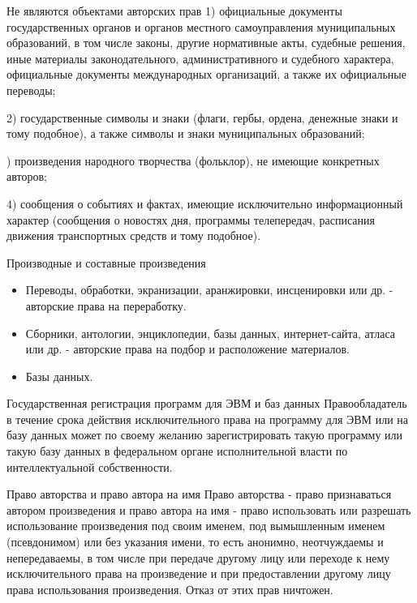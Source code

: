 \documentclass[_Venture_p2.tex]{subfiles}
\begin{document}
\begin{frame}[ allowframebreaks ]{Не являются объектами авторских прав}
1) официальные документы государственных органов и органов местного самоуправления муниципальных образований, в том числе законы, другие нормативные акты, судебные решения, иные материалы законодательного, административного и судебного характера, официальные документы международных организаций, а также их официальные переводы;

2) государственные символы и знаки (флаги, гербы, ордена, денежные знаки и тому подобное), а также символы и знаки муниципальных образований;

) произведения народного творчества (фольклор), не имеющие конкретных авторов;

4) сообщения о событиях и фактах, имеющие исключительно информационный характер (сообщения о новостях дня, программы телепередач, расписания движения транспортных средств и тому подобное).
\end{frame}

\begin{frame}{Производные и составные произведения}

\begin{itemize}
	\item Переводы, обработки, экранизации, аранжировки, инсценировки или др. - авторские права на переработку.
	
	\item Сборники, антологии, энциклопедии, базы данных, интернет-сайта, атласа или др. - авторские права на подбор и расположение материалов.
	
	\item Базы данных.
\end{itemize}
\end{frame}

\begin{frame}{Государственная регистрация программ для ЭВМ и баз данных}
Правообладатель в течение срока действия исключительного права на программу для ЭВМ или на базу данных может по своему желанию зарегистрировать такую программу или такую базу данных в федеральном органе исполнительной власти по интеллектуальной собственности.
\end{frame}

\begin{frame}{Право авторства и право автора на имя}
Право авторства - право признаваться автором произведения и право автора на имя - право использовать или разрешать использование произведения под своим именем, под вымышленным именем (псевдонимом) или без указания имени, то есть анонимно, неотчуждаемы и непередаваемы, в том числе при передаче другому лицу или переходе к нему исключительного права на произведение и при предоставлении другому лицу права использования произведения. Отказ от этих прав ничтожен.
\end{frame}
\end{document}

